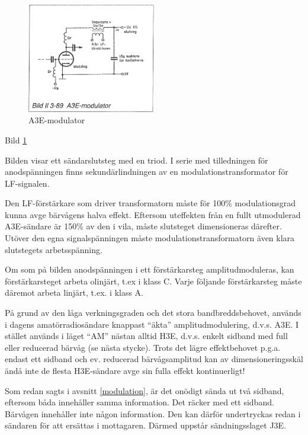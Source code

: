 \begin{figure}
\includegraphics[width=0.5\textwidth]{images/bild_2_3-89}
\caption{A3E-modulator}
\label{fig:BildII3-89}
\end{figure}

Bild \ref{fig:BildII3-89}

Bilden visar ett sändarslutsteg med en triod.  I serie med
tilledningen för anodspänningen finns sekundärlindningen av en
modulationstransformator för LF-signalen.

Den LF-förstärkare som driver transformatorn måste för 100\%
modulationsgrad kunna avge bärvågens halva effekt. Eftersom uteffekten
från en fullt utmodulerad A3E-sändare är 150\% av den i vila, måste
slutsteget dimensioneras därefter. Utöver den egna signalspänningen
måste modulationstransformatorn även klara slutstegets arbetsspänning.

Om som på bilden anodspänningen i ett förstärkarsteg amplitudmoduleras,
kan förstärkarsteget arbeta olinjärt, t.ex i klass C.
Varje följande förstärkarsteg måste däremot arbeta linjärt, t.ex. i klass A.

På grund av den låga verkningsgraden och det stora bandbreddsbehovet,
används i dagens amatörradiosändare knappast ``äkta''
amplitudmodulering, d.v.s. A3E. I stället används i läget ``AM'' nästan
alltid H3E, d.v.s. enkelt sidband med full eller reducerad bärvåg (se
nästa stycke). Trots det lägre effektbehovet p.g.a. endast ett sidband
och ev. reducerad bärvågsamplitud kan av dimensioneringsskäl ändå inte
de flesta H3E-sändare avge sin fulla effekt kontinuerligt!

Som redan sagts i avsnitt \ref{modulation}, är det onödigt sända ut två sidband,
eftersom båda innehåller samma information. Det räcker med ett
sidband. Bärvågen innehåller inte någon information. Den kan därför
undertryckas redan i sändaren för att ersättas i mottagaren. Därmed
uppstår sändningsslaget J3E.

